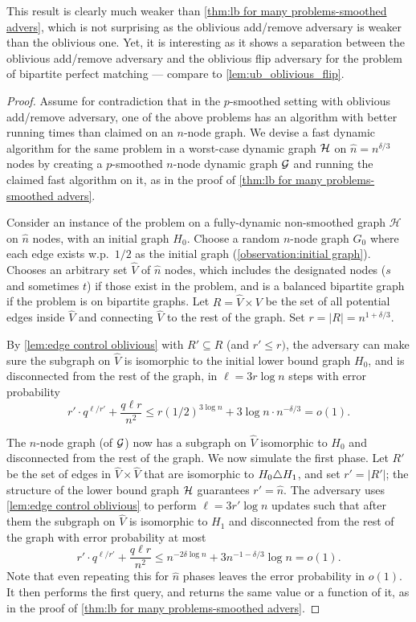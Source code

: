 \documentclass[letter,11pt]{article}
\begin{document}
This result is clearly much weaker than 
\cref{thm:lb for many problems-smoothed advers},
which is not surprising as the oblivious add/remove adversary is weaker than the oblivious one.
Yet, it is interesting as it shows a separation between the oblivious add/remove adversary and the oblivious flip adversary for the problem of bipartite perfect matching --- compare to \cref{lem:ub_oblivious_flip}.

\begin{proof}
	Assume for contradiction that in the $p$-smoothed setting with oblivious add/remove adversary, one of the above problems has an algorithm with better running times than claimed on an $n$-node graph.
	We devise a fast dynamic algorithm for the same problem in a worst-case dynamic graph $\cal H$ on $\hat n=n^{\delta/3}$ nodes
	by creating a $p$-smoothed $n$-node dynamic graph $\cal G$ and running the claimed fast algorithm on it, as in the proof of \cref{thm:lb for many problems-smoothed advers}.
	
	Consider an instance of the problem on a fully-dynamic non-smoothed graph $\mathcal{H}$ on $\hat n $ nodes, with an initial graph $H_0$.
	Choose a random $n$-node graph $G_0$ where each edge exists w.p.~$1/2$ as the initial graph (\cref{observation:initial graph}). 
	Chooses an arbitrary set $\hat V$ of $\hat n$ nodes, 
	which includes the designated nodes ($s$ and sometimes $t$) if those exist in the problem,
	and is a balanced bipartite graph if the problem is on bipartite graphs.
	Let $R=\hat V\times V$ be the set of all potential edges inside $\hat V$ and connecting $\hat V$ to the rest of the graph. 
	Set $r=|R|= n^{1+\delta/3}$.
	
	By \cref{lem:edge control oblivious} with $R'\subseteq R$ (and $r'\leq r)$,
	the adversary can make sure the subgraph on $\hat V$ is isomorphic to the initial lower bound graph $H_0$,
	and is disconnected from the rest of the graph,
	in
	$\ell=3r\log n$
	steps with error probability 
	\[
	r'\cdot q^{\ell/r'} + \frac{q\ell r}{n^2}
	\leq r (1/2)^{3\log n} + 3\log n \cdot n^{-\delta/3}
	= o(1) .
	\]
	
	The $n$-node graph (of $\cal G$) now has a subgraph on $\hat V$  isomorphic to $H_0$ and disconnected from the rest of the graph.
	We now simulate the first phase.
	Let $R'$ be the set of edges in $\hat V\times \hat V$ that are isomorphic to $H_0\triangle H_1$, and set $r'=|R'|$;
	the structure of the lower bound graph $\cal H$ guarantees 
	$r'=\hat n$.
	The adversary uses \cref{lem:edge control oblivious}  
	to perform %
	$\ell=3r'\log n$
	updates
	such that after them the subgraph on $\hat V$ is isomorphic to $H_1$ and disconnected from the rest of the graph with error probability at most
	\[
	r'\cdot q^{\ell/r'} + \frac{q\ell r}{n^2}
	\leq n^{-2\delta\log n} + 3n^{-1-\delta/3}\log n
	= o(1) .
	\]
	Note that even repeating this for $\hat n$ phases leaves the error probability in $o(1)$.
	It then performs the first query, and returns the same value or a function of it, as in the proof of
	\cref{thm:lb for many problems-smoothed advers}.
	

\end{proof}
\end{document}
